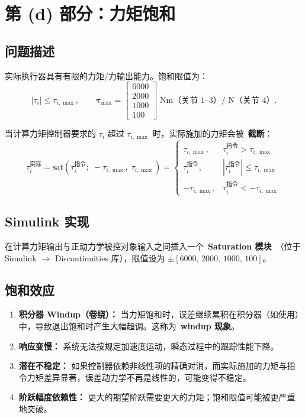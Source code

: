 \documentclass[12pt,a4paper]{ctexart}
\begin{document}
\section{第 (d) 部分：力矩饱和}

\subsection{问题描述}

实际执行器具有有限的力矩/力输出能力。饱和限值为：
\[
|\tau_i| \le \tau_{i,\max},\qquad
\bm{\tau}_{\max} = \begin{bmatrix} 6000 \\ 2000 \\ 1000 \\ 100 \end{bmatrix}
\;\text{Nm（关节 1--3）/ N（关节 4）}.
\]

当计算力矩控制器要求的 $\tau_i$ 超过 $\tau_{i,\max}$ 时，实际施加的力矩会被\ \textbf{截断}：
\[
\tau_i^{\text{实际}} = \mathrm{sat}(\tau_i^{\text{指令}};\;-\tau_{i,\max},\;\tau_{i,\max})
= \begin{cases}
\tau_{i,\max}, & \tau_i^{\text{指令}} > \tau_{i,\max} \\
\tau_i^{\text{指令}}, & |\tau_i^{\text{指令}}| \le \tau_{i,\max} \\
-\tau_{i,\max}, & \tau_i^{\text{指令}} < -\tau_{i,\max}
\end{cases}
\]

\subsection{Simulink 实现}

\begin{stepbox}[饱和模块的放置]
在计算力矩输出与正动力学被控对象输入之间插入一个\ \textbf{Saturation 模块}\ （位于 Simulink $\to$ Discontinuities 库），限值设为 $\pm[6000,\,2000,\,1000,\,100]$。
\end{stepbox}

\subsection{饱和效应}

\begin{conceptbox}[关键现象]
\begin{enumerate}
  \item \textbf{积分器 Windup（卷绕）：} 当力矩饱和时，误差继续累积在积分器（如使用）中，导致退出饱和时产生大幅超调。这称为\ \textbf{windup 现象}。
  \item \textbf{响应变慢：} 系统无法按规定加速度运动，瞬态过程中的跟踪性能下降。
  \item \textbf{潜在不稳定：} 如果控制器依赖非线性项的精确对消，而实际施加的力矩与指令力矩差异显著，误差动力学不再是线性的，可能变得不稳定。
  \item \textbf{阶跃幅度依赖性：} 更大的期望阶跃需要更大的力矩；饱和限值可能被更严重地突破。
\end{enumerate}
\end{conceptbox}
\end{document}
